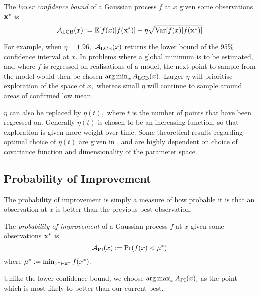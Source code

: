 \begin{definition}
    The \emph{lower confidence bound} of a Gaussian process $f$ at $x$ given
    some observations $\mathbf{x}^\ast$ is
    $$
        \mathcal{A}_\mathrm{LCB}(x)
        := \operatorname{\mathbb{E}}[f(x) | f(\mathbf{x}^\ast)]
        - \eta \sqrt{\mathrm{Var}[f(x) | f(\mathbf{x}^\ast)]}
    $$
\end{definition}

\begin{figure}
\end{figure}

For example, when $\eta = 1.96,$ $\mathcal{A}_\text{LCB}(x)$ returns the lower
bound of the 95\% confidence interval at $x.$ In problems where a global
minimum is to be estimated, and where $f$ is regressed on realisations of
a model, the next point to sample from the
model would then be chosen $\operatorname*{arg\,min}_{x} A_\mathrm{LCB}(x).$
Larger $\eta$ will prioritise
exploration of the space of $x,$ whereas small $\eta$ will continue to sample
around areas of confirmed low mean.

$\eta$ can also be replaced by
$\eta(t),$ where $t$ is the number of points that have been regressed on.
Generally $\eta(t)$ is chosen to be an increasing function, so that exploration
is given more weight over time. Some theoretical results regarding optimal
choice of
$\eta(t)$ are given in \cite{srinivas_gaussian_2010}, and are highly dependent
on choice of covariance function and dimensionality of the parameter space.

\subsection*{Probability of Improvement}

The probability of improvement is simply a measure of how probable it is that
an observation at $x$ is better than the previous best observation.

\begin{definition}
    The \emph{probability of improvement} of a Gaussian process $f$ at $x$ given
    some observations $\mathbf{x}^\ast$ is
    $$
        \mathcal{A}_\mathrm{PI}(x) := \Pr(f(x) < \mu^\ast)
    $$
    where $\mu^\ast := \min_{x^\ast\in\mathbf{x}^\ast}f(x^\ast).$
\end{definition}

Unlike the lower confidence bound, we choose $\operatorname*{arg\,max}_{x} A_\mathrm{PI}(x),$ as
the point which is most likely to better than our current best.


